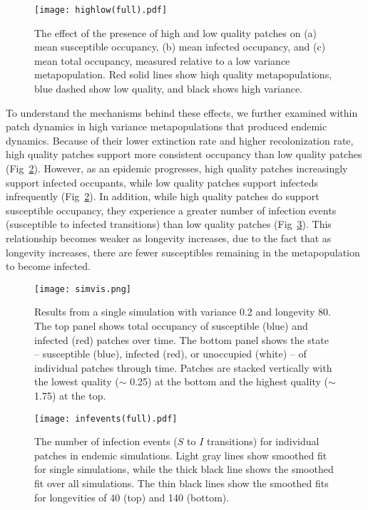 \documentclass{svjour3}
\begin{document}
\begin{figure}
\centering
\texttt{[image: highlow(full).pdf]}
\caption{The effect of the presence of high and low quality patches on (a) mean susceptible occupancy, (b) mean infected occupancy, and (c) mean total occupancy, measured relative to  a low variance metapopulation.  Red solid lines show hiqh quality metapopulations, blue dashed show low quality, and black shows high variance.}
\label{sens}
\end{figure}

To understand the mechanisms behind these effects, we further examined within patch dynamics in high variance metapopulations that produced endemic dynamics.  Because of their lower extinction rate and higher recolonization rate, high quality patches support more consistent occupancy than low quality patches (Fig~\ref{simvis}).  However, as an epidemic progresses, high quality patches increasingly support infected occupants, while low quality patches support infecteds infrequently (Fig~\ref{simvis}).  In addition, while high quality patches do support susceptible occupancy, they experience a greater number of infection events (susceptible to infected transitions) than low quality patches (Fig~\ref{infections}).  This relationship becomes weaker as longevity increases, due to the fact that as longevity increases, there are fewer susceptibles remaining in the metapopulation to become infected.  

\begin{figure}
\centering
\texttt{[image: simvis.png]}
\caption{Results from a single simulation with variance 0.2 and longevity 80.  The top panel shows total occupancy of susceptible (blue) and infected (red) patches over time.  The bottom panel shows the state -- susceptible (blue), infected (red), or unoccupied (white) -- of individual patches through time.  Patches are stacked vertically with the lowest quality ($\sim$ 0.25) at the bottom and the highest quality ($\sim$ 1.75) at the top.}
\label{simvis}
\end{figure}


\begin{figure}
\centering
\texttt{[image: infevents(full).pdf]}
\caption{The number of infection events ($S$ to $I$ transitions) for individual patches in endemic simulations.  Light gray lines show smoothed fit for single simulations, while the thick black line shows the smoothed fit over all simulations.  The thin black lines show the smoothed fits for longevities of 40 (top) and 140 (bottom).}
\label{infections}
\end{figure}
\end{document}
